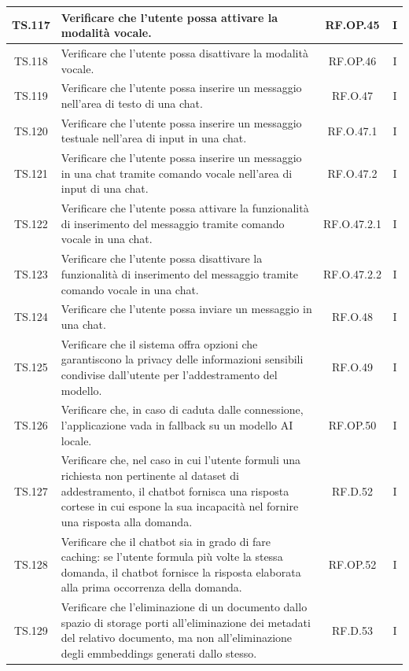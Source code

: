 \begin{xltabular}{\textwidth}{|c|X|c|c|}
\hline
TS.117 & Verificare che l'utente possa attivare la modalità vocale. & RF.OP.45 & I \\
\hline
TS.118 & Verificare che l'utente possa disattivare la modalità vocale. & RF.OP.46 & I \\
\hline
TS.119 & Verificare che l'utente possa inserire un messaggio nell’area di testo di una chat. & RF.O.47 & I \\
\hline
TS.120 & Verificare che l'utente possa inserire un messaggio testuale nell’area di input in una chat. & RF.O.47.1 & I \\
\hline
TS.121 & Verificare che l'utente possa inserire un messaggio in una chat tramite comando vocale nell’area di input di una chat. & RF.O.47.2 & I \\
\hline
TS.122 & Verificare che l'utente possa attivare la funzionalità di inserimento del messaggio tramite comando vocale in una chat. & RF.O.47.2.1 & I \\
\hline
TS.123 & Verificare che l'utente possa disattivare la funzionalità di inserimento del messaggio tramite comando vocale in una chat. & RF.O.47.2.2 & I \\
\hline
TS.124 & Verificare che l'utente possa inviare un messaggio in una chat. & RF.O.48 & I \\
\hline
TS.125 & Verificare che il sistema offra opzioni che garantiscono la privacy delle informazioni sensibili condivise dall’utente per l’addestramento del modello. & RF.O.49 & I \\
\hline
TS.126 & Verificare che, in caso di caduta dalle connessione, l’applicazione vada in fallback su un modello AI locale. & RF.OP.50 & I \\
\hline
TS.127 & Verificare che, nel caso in cui l’utente formuli una richiesta non pertinente al dataset di addestramento, il chatbot fornisca una risposta cortese in cui espone la sua incapacità nel fornire una risposta alla domanda. & RF.D.52 & I \\
\hline
TS.128 & Verificare che il chatbot sia in grado di fare caching: se l’utente formula più volte la stessa domanda, il chatbot fornisce la risposta elaborata alla prima occorrenza della domanda. & RF.OP.52 & I \\
\hline
TS.129 & Verificare che l’eliminazione di un documento dallo spazio di storage porti all’eliminazione dei metadati del relativo documento, ma non all’eliminazione degli emmbeddings generati dallo stesso. & RF.D.53 & I \\
\hline
\end{xltabular}

